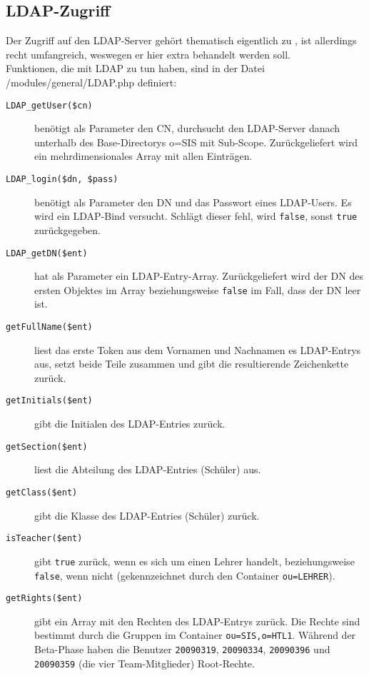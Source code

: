 \subsection{LDAP-Zugriff}
\label{sec:content_imple_ldap}
Der Zugriff auf den LDAP-Server gehört thematisch eigentlich zu , ist allerdings recht umfangreich, weswegen er hier extra behandelt werden soll.\\
Funktionen, die mit LDAP zu tun haben, sind in der Datei /modules/general/LDAP.php definiert:
\begin{description}
	\item[\texttt{LDAP\_getUser(\$cn)}] benötigt als Parameter den CN, durchsucht den LDAP-Server danach unterhalb des Base-Directorys o=SIS mit Sub-Scope. Zurückgeliefert wird ein mehrdimensionales Array mit allen Einträgen.
	\item[\texttt{LDAP\_login(\$dn, \$pass)}] benötigt als Parameter den DN und das Passwort eines LDAP-Users. Es wird ein LDAP-Bind versucht. Schlägt dieser fehl, wird \texttt{false}, sonst \texttt{true} zurückgegeben.
	\item[\texttt{LDAP\_getDN(\$ent)}] hat als Parameter ein LDAP-Entry-Array. Zurückgeliefert wird der DN des ersten Objektes im Array beziehungsweise \texttt{false} im Fall, dass der DN leer ist.
	\item[\texttt{getFullName(\$ent)}] liest das erste Token aus dem Vornamen und Nachnamen es LDAP-Entrys aus, setzt beide Teile zusammen und gibt die resultierende Zeichenkette zurück.
	\item[\texttt{getInitials(\$ent)}] gibt die Initialen des LDAP-Entries zurück.
	\item[\texttt{getSection(\$ent)}] liest die Abteilung des LDAP-Entries (Schüler) aus.
	\item[\texttt{getClass(\$ent)}] gibt die Klasse des LDAP-Entries (Schüler) zurück.
	\item[\texttt{isTeacher(\$ent)}] gibt \texttt{true} zurück, wenn es sich um einen Lehrer handelt, beziehungsweise \texttt{false}, wenn nicht (gekennzeichnet durch den Container \texttt{ou=LEHRER}).
	\item[\texttt{getRights(\$ent)}] gibt ein Array mit den Rechten des LDAP-Entrys zurück. Die Rechte sind bestimmt durch die Gruppen im Container \texttt{ou=SIS,o=HTL1}. Während der Beta-Phase haben die Benutzer \texttt{20090319}, \texttt{20090334}, \texttt{20090396} und \texttt{20090359} (die vier Team-Mitglieder) Root-Rechte.
\end{description}

